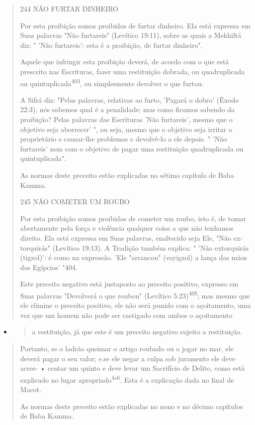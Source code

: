 \begin{quote}
244 NÃO FURTAR DINHEIRO

Por esta proibição somos proibidos de furtar dinheiro. Ela está
ex­pressa em Suas palavras "Não furtareis" (Levítico 19:11), sobre as
quais a Mek­hiltá diz: " 'Não furtareis': esta é a proibição, de furtar
dinheiro".

Aquele que infringir esta proibição deverá, de acordo com o que es­tá
prescrito nas Escrituras, fazer uma restituição dobrada, ou
quadruplicada ou quintuplicada\textsuperscript{403}, ou simplesmente
devolver o que furtou.

A Sifrá diz: "Pelas palavras, relativas ao furto, 'Pagará o dobro'
(Êxo­do 22:3), nós sabemos qual é a penalidade; mas como ficamos sabendo
da proi­bição? Pelas palavras das Escrituras 'Não furtareis', mesmo que
o objetivo seja aborrecer' ", ou seja, mesmo que o objetivo seja irritar
o proprietário e causar-lhe problemas e devolvê-lo a ele depois. " 'Não
furtareis' nem com o objetivo de pagar uma restituição quadruplicada ou
quintuplicada".

As normas deste preceito estão explicadas no sétimo capítulo de Ba­ba
Kamma.

245 NÃO COMETER UM ROUBO

Por esta proibição somos proibidos de cometer um roubo, isto é, de tomar
abertamente pela força e violência qualquer coisa a que não tenha­mos
direito. Ela está expressa em Suas palavras, enaltecido seja Ele, "Não
ex­torquirás" (Levítico 19:13). A Tradição também explica: " 'Não
extorquirás (tig­zol)': é como na expressão. 'Ele "arrancou" (vayigzol)
a lança das mãos dos Egípcios' "404.

Este preceito negativo está justaposto ao preceito positivo, expres­so
em Suas palavras "Devolverá o que roubou" (Levítico
5:23)\textsuperscript{405}; mas mes­mo que ele elimine o preceito
positivo, ele não será punido com o açoitamen­to, uma vez que um homem
não pode ser castigado com ambos o açoitamento
\end{quote}

\begin{itemize}
\item
  \begin{quote}
  a restituição, já que este é um preceito negativo sujeito a
  restituição.
  \end{quote}
\end{itemize}

\begin{quote}
Portanto, se o ladrão queimar o artigo roubado ou o jogar no mar, ele
deverá pagar o seu valor; e.se ele negar a culpa sob juramento ele deve
acres- • centar um quinto e deve levar um Sacrifício de Delito, como
está explicado no lugar
apropriado\textsuperscript{4}"\textsuperscript{6}. Esta é a explicação
dada no final de Macot.

As normas deste preceito estão explicadas no nono e no décimo ca­pítulos
de Baba Kamma.
\end{quote}

